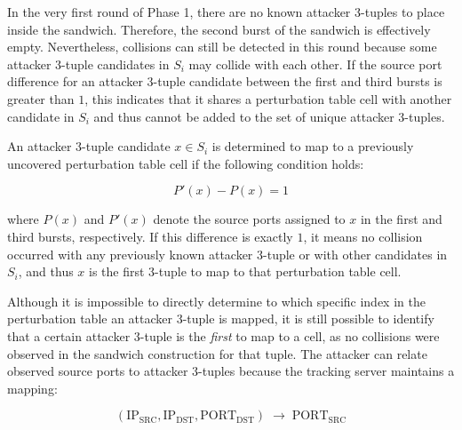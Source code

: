 \documentclass{report}
\begin{document}

In the very first round of Phase 1, there are no known attacker 3-tuples to place inside the sandwich. Therefore, the second burst of the sandwich is effectively empty. Nevertheless, collisions can still be detected in this round because some attacker 3-tuple candidates in $S_i$ may collide with each other. If the source port difference for an attacker 3-tuple candidate between the first and third bursts is greater than $1$, this indicates that it shares a perturbation table cell with another candidate in $S_i$ and thus cannot be added to the set of unique attacker 3-tuples.


An attacker 3-tuple candidate $x \in S_i$ is determined to map to a previously uncovered perturbation table cell if the following condition holds:

\[
	P'(x) - P(x) = 1
\]

where $P(x)$ and $P'(x)$ denote the source ports assigned to $x$ in the first and third bursts, respectively. If this difference is exactly $1$, it means no collision occurred with any previously known attacker 3-tuple or with other candidates in $S_i$, and thus $x$ is the first 3-tuple to map to that perturbation table cell.


Although it is impossible to directly determine to which specific index in the perturbation table an attacker 3-tuple is mapped, it is still possible to identify that a certain attacker 3-tuple is the \emph{first} to map to a cell, as no collisions were observed in the sandwich construction for that tuple. The attacker can relate observed source ports to attacker 3-tuples because the tracking server maintains a mapping:

\[
	(\mathrm{IP_{SRC}}, \mathrm{IP_{DST}}, \mathrm{PORT_{DST}}) \;\rightarrow\; \mathrm{PORT_{SRC}}
\]
\end{document}
